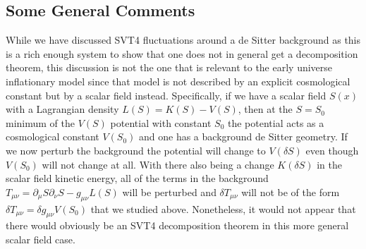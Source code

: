 \documentclass[aps,onecolumn,10pt]{revtex4}
\numberwithin{equation}{section}
\numberwithin{equation}{section}
\begin{document}
\subsection{Some General Comments}

While we have discussed SVT4 fluctuations around a de Sitter background as this is a rich enough system to show that one does not in general get a decomposition theorem, this discussion is not the one that is relevant to the early universe  inflationary model since that model is not described by an explicit cosmological constant but by a scalar field instead. Specifically, if we have a scalar field $S(x)$ with a Lagrangian density $L(S)=K(S)-V(S)$, then at the $S=S_0$ minimum of the $V(S)$ potential with constant $S_0$ the potential acts as a cosmological constant $V(S_0)$ and one has a background de Sitter geometry. If we now perturb the background the potential will change to $V(\delta S)$ even though $V(S_0)$ will not change at all. With there also being a change $K(\delta S)$ in  the scalar field kinetic energy, all of the terms in the background $T_{\mu\nu}=\partial_{\mu}S\partial_{\nu}S-g_{\mu\nu}L(S)$ will be perturbed and $\delta T_{\mu\nu}$ will not be of the form $\delta T_{\mu\nu}=\delta g_{\mu\nu}V(S_0)$ that we studied above. Nonetheless, it would not appear that there would obviously be an SVT4 decomposition theorem in  this more general scalar field case.
\end{document}
